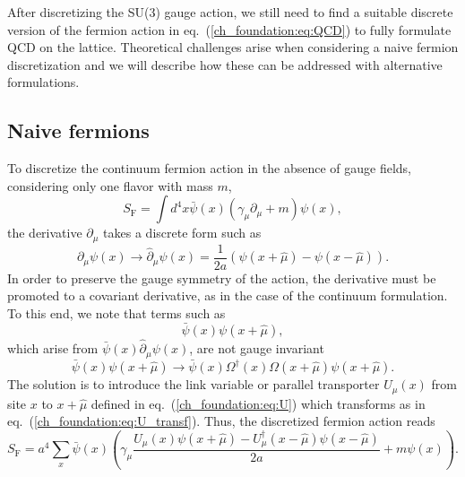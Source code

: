 
After discretizing the SU(3) gauge action, we still need to find a suitable discrete version of the fermion action in eq.~(\ref{ch_foundation:eq:QCD}) to fully formulate QCD on the lattice. Theoretical challenges arise when considering a naive fermion discretization and we will describe how these can be addressed with alternative formulations.

\subsection{Naive fermions}
\label{ch_foundation:subsec:Naive}

To discretize the continuum fermion action in the absence of gauge fields, considering only one flavor with mass $m$,
\begin{equation}
S_{\textrm{F}}=\int d^4x\bar{\psi}(x)\left(\gamma_{\mu}\partial_{\mu}+m\right)\psi(x),
\end{equation}
the derivative $\partial_{\mu}$ takes a discrete form such as
\begin{equation}
\partial_{\mu}\psi(x)\rightarrow\hat{\partial}_{\mu}\psi(x)=\frac{1}{2a}\left(\psi(x+\hat{\mu})-\psi(x-\hat{\mu})\right).
\end{equation}
In order to preserve the gauge symmetry of the action, the derivative must be promoted to a covariant derivative, as in the case of the continuum formulation. To this end, we note that terms such as
\begin{equation}
\bar{\psi}(x)\psi(x+\hat{\mu}),
\end{equation}
which arise from $\bar{\psi}(x)\hat{\partial}_{\mu}\psi(x)$, are not gauge invariant
\begin{equation}
\bar{\psi}(x)\psi(x+\hat{\mu})\to\bar{\psi}(x)\Omega^{\dagger}(x)\Omega(x+\hat{\mu})\psi(x+\hat{\mu}).
\end{equation}
The solution is to introduce the link variable or parallel transporter $U_{\mu}(x)$ from site $x$ to $x+\hat{\mu}$ defined in eq.~(\ref{ch_foundation:eq:U}) which transforms as in eq.~(\ref{ch_foundation:eq:U_transf}). Thus, the discretized fermion action reads
\begin{equation}
\label{ch_foundation:eq:naive}
S_{\textrm{F}}=a^4\sum_x\bar{\psi}(x)\left(\gamma_{\mu}\frac{U_{\mu}(x)\psi(x+\hat{\mu})-U_{\mu}^{\dagger}(x-\hat{\mu})\psi(x-\hat{\mu})}{2a}+m\psi(x)\right).
\end{equation}


